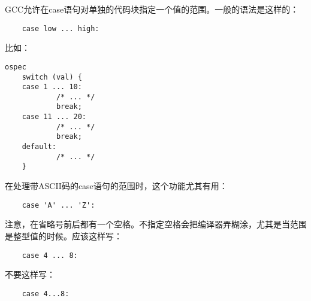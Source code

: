 GCC允许在case语句对单独的代码块指定一个值的范围。一般的语法是这样的：
\begin{lstlisting}
    case low ... high:
\end{lstlisting}
比如：
\begin{lstlisting}ospec
    switch (val) {
    case 1 ... 10:
            /* ... */
            break;
    case 11 ... 20:
            /* ... */
            break;
    default:
            /* ... */
    }
\end{lstlisting}
在处理带ASCII码的case语句的范围时，这个功能尤其有用：
\begin{lstlisting}
    case 'A' ... 'Z':
\end{lstlisting}


注意，在省略号前后都有一个空格。不指定空格会把编译器弄糊涂，尤其是当范围是整型值的时候。应该这样写：
\begin{lstlisting}
    case 4 ... 8:
\end{lstlisting}
不要这样写：
\begin{lstlisting}
    case 4...8:
\end{lstlisting}

